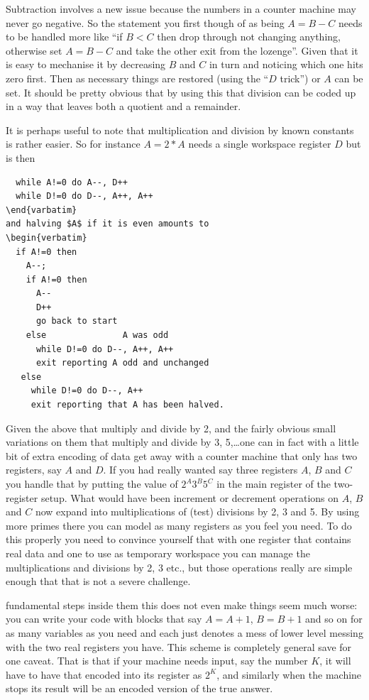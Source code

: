 Subtraction involves a new issue because the numbers in a counter machine
may never go negative. So the statement you first though of as being
$A = B - C$ needs to be handled more like
``if $B < C$ then drop through not changing anything,
otherwise set $A = B - C$ and take the other exit from the lozenge''.
Given that it is easy to mechanise it by decreasing $B$ and $C$ in turn and
noticing which one hits zero first. Then as necessary things are restored
(using the ``$D$ trick'') or $A$ can be set. It should be pretty obvious
that by using this that division can be coded up in a way that leaves
both a quotient and a remainder.

It is perhaps useful to note that multiplication and division by
known constants is rather easier. So for instance $A = 2*A$ needs
a single workspace register $D$ but is then
\begin{verbatim}
  while A!=0 do A--, D++
  while D!=0 do D--, A++, A++
\end{varbatim}
and halving $A$ if it is even amounts to
\begin{verbatim}
  if A!=0 then
    A--;
    if A!=0 then
      A--
      D++
      go back to start
    else               A was odd
      while D!=0 do D--, A++, A++
      exit reporting A odd and unchanged
   else
     while D!=0 do D--, A++
     exit reporting that A has been halved.
\end{verbatim} 

Given the above that multiply and divide by 2, and the fairly obvious small
variations on them that multiply and divide by 3, 5,\ldots one can in fact
with a little bit of extra encoding of data get away with a counter machine
that only has two registers, say $A$ and $D$. If you had really wanted
say three registers $A$, $B$ and $C$ you handle that by putting the value
of $2^A 3^B 5^C$ in the main register of the two-register setup. What would
have been increment or decrement operations on $A$, $B$ and $C$ now
expand into multiplications of (test) divisions by 2, 3 and 5. By using
more primes there you can model as many registers as you feel you need.
To do this properly you need to convince yourself that with one register that
contains real data and one to use as temporary workspace you can manage the
multiplications and divisions by 2, 3 etc., but those operations really are
simple enough that that is not a severe challenge.

fundamental steps inside them this does not even make things seem much worse:
you can write your code with blocks that say $A=A+1$, $B=B+1$ and so on
for as many variables as you need and each just denotes a mess of
lower level messing with the two real registers you have. This
scheme is completely general save for one caveat. That is that if
your machine needs input, say the number $K$, it will have to have
that encoded into its register as $2^K$, and similarly when the
machine stops its result will be an encoded version of the true
answer.

